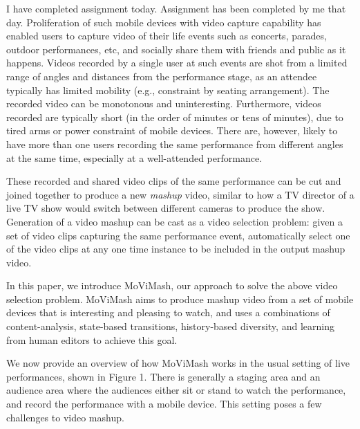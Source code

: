\documentclass{new}
\begin{document}
I have completed assignment today.
Assignment has been completed by me that day.
Proliferation of such mobile devices with video capture capability
has enabled users to capture video of their life events such
as concerts, parades, outdoor performances, etc, and socially share
them with friends and public as it happens. Videos recorded by
a single user at such events are shot from a limited range of angles
and distances from the performance stage, as an attendee typically
has limited mobility (e.g., constraint by seating arrangement).
The recorded video can be monotonous and uninteresting. Furthermore,
videos recorded are typically short (in the order of minutes
or tens of minutes), due to tired arms or power constraint of mobile
devices. There are, however, likely to have more than one users
recording the same performance from different angles at the same
time, especially at a well-attended performance.

These recorded and shared video clips of the same performance
    can be cut and joined together to produce a new \textit{mashup} video,
similar to how a TV director of a live TV show would switch between
different cameras to produce the show. Generation of a video
mashup can be cast as a video selection problem: given a set of
video clips capturing the same performance event, automatically
select one of the video clips at any one time instance to be included
in the output mashup video.

In this paper, we introduce MoViMash, our approach to solve
the above video selection problem. MoViMash aims to produce
mashup video from a set of mobile devices that is interesting and
pleasing to watch, and uses a combinations of content-analysis,
state-based transitions, history-based diversity, and learning from
human editors to achieve this goal.

We now provide an overview of how MoViMash works in the
usual setting of live performances, shown in Figure 1. There is
generally a staging area and an audience area where the audiences
either sit or stand to watch the performance, and record the performance
with a mobile device. This setting poses a few challenges to
video mashup.
\end{document}
